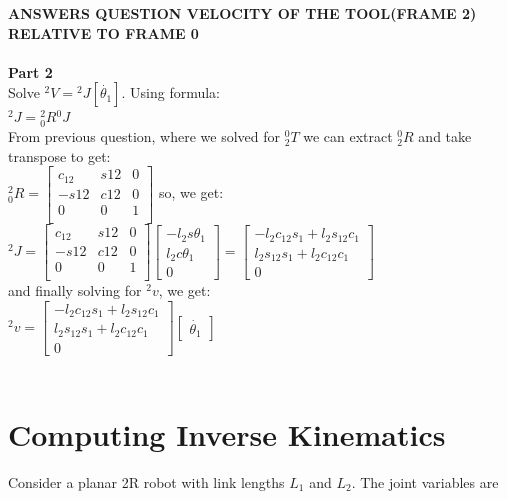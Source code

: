 \documentclass{article}
\begin{document}
\textbf{ANSWERS QUESTION VELOCITY OF THE TOOL(FRAME 2) RELATIVE TO FRAME 0}\\\\
\textbf{Part 2}\\
Solve ${}^2V={}^2J[\dot{\theta_1}]$. Using formula:\\
${}^2J={}^2_0 R {}^0J$\\
From previous question, where we solved for ${}^0_2 T$ we can extract ${}^0_2 R$ and take transpose to get:\\
${}^2_0 R=\begin{bmatrix}
c_{12} & s{12} & 0 \\
-s{12} & c{12} & 0 \\
0 & 0 & 1\\
\end{bmatrix}$ so, we get:\\
${}^2J=\begin{bmatrix}
c_{12} & s{12} & 0 \\
-s{12} & c{12} & 0 \\
0 & 0 & 1\\
\end{bmatrix}
\begin{bmatrix}
-l_2s\theta_1\\
l_2c\theta_1\\
0
\end{bmatrix}=
\begin{bmatrix}
-l_2c_{12}s_1 + l_2s_{12}c_1\\
l_2s_{12}s_1 + l_2c_{12}c_1\\
0
\end{bmatrix}$\\ and finally solving for ${}^2v$, we get:\\
${}^2v=\begin{bmatrix}
-l_2c_{12}s_1 + l_2s_{12}c_1\\
l_2s_{12}s_1 + l_2c_{12}c_1\\
0
\end{bmatrix}\begin{bmatrix}
\dot{\theta_1}
\end{bmatrix}$\\\\


\section{Computing Inverse Kinematics}

Consider a planar 2R robot with link lengths $L_1$ and $L_2$.
The joint variables are
\end{document}
